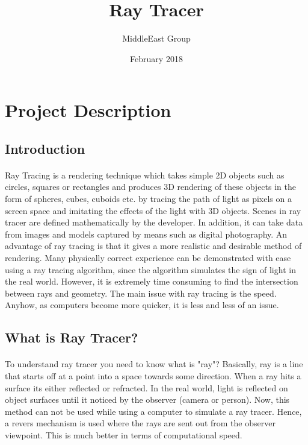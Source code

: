 \documentclass{article}
\title{Ray Tracer}
\author{MiddleEast Group }
\date{February 2018}
\begin{document}
\maketitle 



\section{Project Description}

\subsection{Introduction}
\paragraph{}
Ray Tracing is a rendering technique which takes simple 2D objects such as circles, squares or rectangles and
produces 3D rendering of these objects in the form of spheres, cubes, cuboids etc.  by tracing the path of light as pixels on a screen space and imitating the effects of the light  with 3D objects. Scenes in ray tracer are defined mathematically by the developer. In addition, it can take data from images and models captured by means such as digital photography. \newline An advantage of ray tracing is that it gives a more realistic and desirable method of rendering. Many physically correct experience can be demonstrated with ease using a ray tracing algorithm, since the algorithm simulates the sign of light in the real world.
However, it is extremely time consuming to find the intersection between rays and geometry. The main issue with ray tracing is the speed. Anyhow, as computers become more quicker, it is less and less of an issue. 

\subsection{What is Ray Tracer?}

\paragraph{}
To understand ray tracer you need to know what is "ray"? Basically, ray is a line that starts off at a point into a space towards some direction. When a ray hits a surface its either reflected or refracted.
In the real world, light is reflected on object surfaces until it noticed by the observer (camera or person). \newline Now, this method can not be used while using a computer to simulate a ray tracer. Hence, a revers mechanism is used where the rays are sent out from the observer viewpoint. This is much better in terms of computational speed. 
\end{document}
